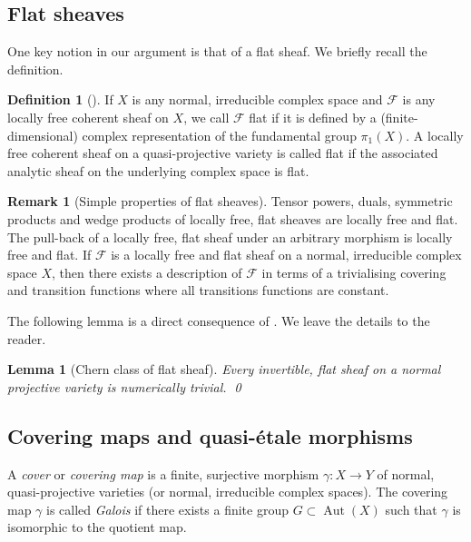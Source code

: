 \documentclass[JEP,XML,SOM,Unicode,published]{cedram}
\let\scr\mathscr
\theoremstyle{plain}
\newtheorem{lem}[thm]{Lemma}
\theoremstyle{definition}
\newtheorem{defn}[thm]{Definition}
\newtheorem{rem}[thm]{Remark}
\numberwithin{equation}{thm}
\numberwithin{enumi}{thm}
\DeclareMathOperator{\Aut}{Aut}
\newcommand{\sF}{\scr{F}}
\begin{document}
\subsection{Flat sheaves}

One key notion in our argument is that of a flat sheaf. We briefly recall the
definition.

\begin{defn}[]\label{defn:flat}
If $X$ is any normal, irreducible complex space and $\sF$ is any locally free
coherent sheaf on $X$, we call $\sF$ flat if it is defined by a
(finite-dimensional) complex representation of the fundamental group $\pi_1(X)$.
A locally free coherent sheaf on a quasi-projective variety is called flat if
the associated analytic sheaf on the underlying complex space is flat.
\end{defn}

\begin{rem}[Simple properties of flat sheaves]\label{rem:2-3}
Tensor powers, duals, symmetric products and wedge products of locally free,
flat sheaves are locally free and flat. The pull-back of a locally free, flat
sheaf under an arbitrary morphism is locally free and flat. If $\sF$ is a
locally free and flat sheaf on a normal, irreducible complex space $X$, then
there exists a description of $\sF$ in terms of a trivialising covering and
transition functions where all transitions functions are constant.
\end{rem}

The following lemma is a direct consequence of \cite[Chap.\,II,
Prop.\,3.1]{Kob87}. We leave the details to the reader.

\begin{lem}[Chern class of flat sheaf]\label{lem:c1offlat}
Every invertible, flat sheaf on a normal projective variety is numerically
trivial. \qed
\end{lem}

\subsection{Covering maps and quasi-étale morphisms}

A \emph{cover} or \emph{covering map} is a finite, surjective morphism
$\gamma : X \to Y$ of normal, quasi-projective varieties (or normal, irreducible
complex spaces). The covering map $\gamma$ is called \emph{Galois} if there exists a
finite group $G \subset \Aut(X)$ such that $\gamma$ is isomorphic to the quotient map.
\end{document}
